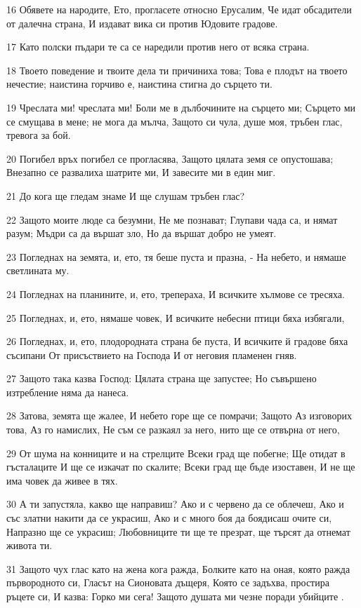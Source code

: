 \par 16 Обявете на народите, Ето, прогласете относно Ерусалим, Че идат обсадители от далечна страна, И издават вика си против Юдовите градове.
\par 17 Като полски пъдари те са се наредили против него от всяка страна.
\par 18 Твоето поведение и твоите дела ти причиниха това; Това е плодът на твоето нечестие; наистина горчиво е, наистина стигна до сърцето ти.
\par 19 Чреслата ми! чреслата ми! Боли ме в дълбочините на сърцето ми; Сърцето ми се смущава в мене; не мога да мълча, Защото си чула, душе моя, тръбен глас, тревога за бой.
\par 20 Погибел връх погибел се прогласява, Защото цялата земя се опустошава; Внезапно се развалиха шатрите ми, И завесите ми в един миг.
\par 21 До кога ще гледам знаме И ще слушам тръбен глас?
\par 22 Защото моите люде са безумни, Не ме познават; Глупави чада са, и нямат разум; Мъдри са да вършат зло, Но да вършат добро не умеят.
\par 23 Погледнах на земята, и, ето, тя беше пуста и празна, - На небето, и нямаше светлината му.
\par 24 Погледнах на планините, и, ето, трепераха, И всичките хълмове се тресяха.
\par 25 Погледнах, и, ето, нямаше човек, И всичките небесни птици бяха избягали,
\par 26 Погледнах, и, ето, плодородната страна бе пуста, И всичките й градове бяха съсипани От присъствието на Господа И от неговия пламенен гняв.
\par 27 Защото така казва Господ: Цялата страна ще запустее; Но съвършено изтребление няма да нанеса.
\par 28 Затова, земята ще жалее, И небето горе ще се помрачи; Защото Аз изговорих това, Аз го намислих, Не съм се разкаял за него, нито ще се отвърна от него,
\par 29 От шума на конниците и на стрелците Всеки град ще побегне; Ще отидат в гъсталаците И ще се изкачат по скалите; Всеки град ще бъде изоставен, И не ще има човек да живее в тях.
\par 30 А ти запустяла, какво ще направиш? Ако и с червено да се облечеш, Ако и със златни накити да се украсиш, Ако и с много боя да боядисаш очите си, Напразно ще се украсиш; Любовниците ти ще те презрат, ще търсят да отнемат живота ти.
\par 31 Защото чух глас като на жена кога ражда, Болките като на оная, която ражда първородното си, Гласът на Сионовата дъщеря, Която се задъхва, простира ръцете си, И казва: Горко ми сега! Защото душата ми чезне поради убийците .

